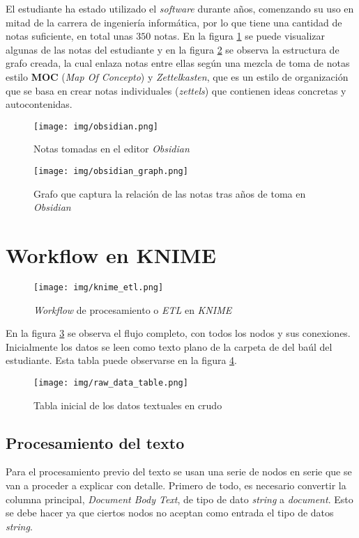 \documentclass[12pt,letterpaper]{article}
\begin{document}
El estudiante ha estado utilizado el \textit{software} durante años, comenzando su uso en mitad de la carrera de ingeniería informática, por lo que tiene una cantidad de notas suficiente, en total unas $350$ notas. En la figura \ref{fig:obsidian_preview} se puede visualizar algunas de las notas del estudiante y en la figura \ref{fig:obsidian_graph} se observa la estructura de grafo creada, la cual enlaza notas entre ellas según una mezcla de toma de notas estilo \textbf{MOC} (\textit{Map Of Concepto}) y \textit{Zettelkasten}, que es un estilo de organización que se basa en crear notas individuales (\textit{zettels}) que contienen ideas concretas y autocontenidas.

\begin{figure}[htp]
    \centering
    \texttt{[image: img/obsidian.png]}
    \caption{Notas tomadas en el editor \textit{Obsidian}}
    \label{fig:obsidian_preview}
\end{figure}

\begin{figure}[htp]
    \centering
    \texttt{[image: img/obsidian\_graph.png]}
    \caption{Grafo que captura la relación de las notas tras años de toma en \textit{Obsidian}}
    \label{fig:obsidian_graph}
\end{figure}

\section{Workflow en KNIME}

\begin{figure}[htp]
    \centering
    \texttt{[image: img/knime\_etl.png]}
    \caption{\textit{Workflow} de procesamiento o \textit{ETL} en \textit{KNIME}}
    \label{fig:knime}
\end{figure}

En la figura \ref{fig:knime} se observa el flujo completo, con todos los nodos y sus conexiones. Inicialmente los datos se leen como texto plano de la carpeta de  del baúl del estudiante. Esta tabla puede observarse en la figura \ref{fig:raw_data}.

\begin{figure}[htp]
    \centering
    \texttt{[image: img/raw\_data\_table.png]}
    \caption{Tabla inicial de los datos textuales en crudo}
    \label{fig:raw_data}
\end{figure}

\subsection{Procesamiento del texto}
Para el procesamiento previo del texto se usan una serie de nodos en serie que se van a proceder a explicar con detalle. Primero de todo, es necesario convertir la columna principal, \textit{Document Body Text}, de tipo de dato \textit{string} a \textit{document}. Esto se debe hacer ya que ciertos nodos no aceptan como entrada el tipo de datos \textit{string}.
\end{document}
